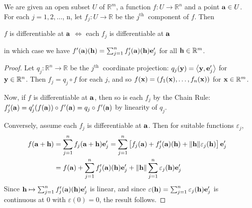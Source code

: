 \documentclass[a4paper]{article}
\begin{document}
\begin{proposition}\label{prop:deriv of projection}
    We are given an open subset $U$ of $\mathbb{R}^{m}$, a function $f: U \rightarrow \mathbb{R}^{n}$ and a point ${\bf a} \in U$. For each $j=1,2, \ldots$, n, let $f_{j}: U \rightarrow \mathbb{R}$ be the $j^{\text {th }}$ component of $f$. Then
    \begin{center}
        $f$ is differentiable at ${\bf a}$ $\Longleftrightarrow$ each $f_{j}$ is differentiable at ${\bf a}$
    \end{center}
    in which case we have $f^{\prime}({\bf a})({\bf h})=\sum_{j=1}^{n} f_{j}^{\prime}({\bf a})({\bf h}) {\bf e}_{j}^{\prime}$ for all ${\bf h} \in \mathbb{R}^{m}$.
\end{proposition}

\begin{proof}
    Let $q_{j}: \mathbb{R}^{n} \rightarrow \mathbb{R}$ be the $j^{\text {th }}$ coordinate projection: $q_{j}({\bf y})=\left\langle {\bf y}, {\bf e}_{j}^{\prime}\right\rangle$ for ${\bf y} \in \mathbb{R}^{n}$.
Then $f_{j}=q_{j} \circ f$ for each $j$, and so $f({\bf x})=\left(f_{1}({\bf x}), \ldots, f_{n}({\bf x})\right)$ for ${\bf x} \in \mathbb{R}^{m}$.

Now, if $f$ is differentiable at ${\bf a}$, then so is each $f_{j}$ by the Chain Rule:
$f_{j}^{\prime}({\bf a})=q_{j}^{\prime}(f({\bf a})) \circ f^{\prime}({\bf a})=q_{j} \circ f^{\prime}({\bf a})$ by linearity of $q_{j}$.

Conversely, assume each $f_{j}$ is differentiable at ${\bf a}$. Then for suitable functions $\varepsilon_{j}$,
$$
\begin{aligned}
f({\bf a}+{\bf h}) &=\sum_{j=1}^{n} f_{j}({\bf a}+{\bf h}) {\bf e}_{j}^{\prime}=\sum_{j=1}^{n}\left[f_{j}({\bf a})+f_{j}^{\prime}({\bf a})({\bf h})+\|{\bf h}\| \varepsilon_{j}({\bf h})\right] {\bf e}_{j}^{\prime} \\
&=f({\bf a})+\sum_{j=1}^{n} f_{j}^{\prime}({\bf a})({\bf h}) {\bf e}_{j}^{\prime}+\|{\bf h}\| \sum_{j=1}^{n} \varepsilon_{j}({\bf h}) {\bf e}_{j}^{\prime}
\end{aligned}
$$
Since ${\bf h} \mapsto \sum_{j=1}^{n} f_{j}^{\prime}({\bf a})({\bf h}) {\bf e}_{j}^{\prime}$ is linear, and since $\varepsilon({\bf h})=\sum_{j=1}^{n} \varepsilon_{j}({\bf h}) {\bf e}_{j}^{\prime}$ is continuous at 0 with $\varepsilon(0)=0$, the result follows.
\end{proof}
\end{document}
